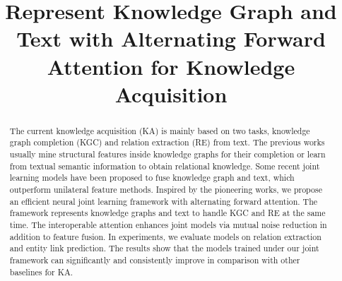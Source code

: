 \documentclass[letterpaper]{article} %
\begin{document}
%
\title{Represent Knowledge Graph and Text with Alternating Forward Attention for Knowledge Acquisition}
\maketitle
\begin{abstract}


The current knowledge acquisition (KA) is mainly based on two tasks, knowledge graph completion (KGC) and relation extraction (RE) from text. The previous works usually mine structural features inside knowledge graphs for their completion or learn from textual semantic information to obtain relational knowledge. Some recent joint learning models have been proposed to fuse knowledge graph and text, which outperform unilateral feature methods. Inspired by the pioneering works, we propose an efficient neural joint learning framework with alternating forward attention. The framework represents knowledge graphs and text to handle KGC and RE at the same time. The interoperable attention enhances joint models via mutual noise reduction in addition to feature fusion. In experiments, we evaluate models on relation extraction and entity link prediction. The results show that the models trained under our joint framework can significantly and consistently improve in comparison with other baselines for KA.

\end{abstract}
\end{document}
